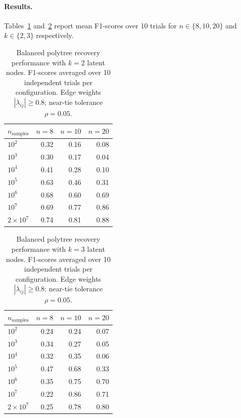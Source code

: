 \documentclass[11pt,a4paper]{article}
\numberwithin{equation}{section}
\begin{document}
\paragraph{Results.}
Tables~\ref{tab:balanced_k2_performance} and~\ref{tab:balanced_k3_performance} report
mean F1-scores over 10 trials for $n \in \{8, 10, 20\}$ and $k \in \{2, 3\}$
respectively.

\begin{table}[h]
\centering
\caption{Balanced polytree recovery performance with $k=2$ latent nodes.
F1-scores averaged over 10 independent trials per configuration.
Edge weights $|\lambda_{ij}| \geq 0.8$; near-tie tolerance $\rho = 0.05$.}
\label{tab:balanced_k2_performance}
\begin{tabular}{lrrr}
\toprule
$n_{\text{samples}}$ & $n=8$ & $n=10$ & $n=20$ \\
\midrule
$10^2$              & 0.32 & 0.16 & 0.08 \\
$10^3$              & 0.30 & 0.17 & 0.04 \\
$10^4$              & 0.41 & 0.28 & 0.10 \\
$10^5$              & 0.63 & 0.46 & 0.31 \\
$10^6$              & 0.68 & 0.60 & 0.69 \\
$10^7$              & 0.69 & 0.77 & 0.86 \\
$2 \times 10^7$     & 0.74 & 0.81 & 0.88 \\
\bottomrule
\end{tabular}
\end{table}

\begin{table}[h]
\centering
\caption{Balanced polytree recovery performance with $k=3$ latent nodes.
F1-scores averaged over 10 independent trials per configuration.
Edge weights $|\lambda_{ij}| \geq 0.8$; near-tie tolerance $\rho = 0.05$.}
\label{tab:balanced_k3_performance}
\begin{tabular}{lrrr}
\toprule
$n_{\text{samples}}$ & $n=8$ & $n=10$ & $n=20$ \\
\midrule
$10^2$              & 0.24 & 0.24 & 0.07 \\
$10^3$              & 0.34 & 0.27 & 0.05 \\
$10^4$              & 0.32 & 0.35 & 0.06 \\
$10^5$              & 0.47 & 0.68 & 0.33 \\
$10^6$              & 0.35 & 0.75 & 0.70 \\
$10^7$              & 0.22 & 0.86 & 0.71 \\
$2 \times 10^7$     & 0.25 & 0.78 & 0.80 \\
\bottomrule
\end{tabular}
\end{table}
\end{document}
